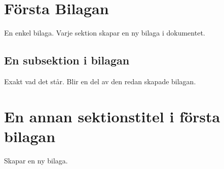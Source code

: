 \section{Första Bilagan}
En enkel bilaga. Varje sektion skapar en ny bilaga i dokumentet.

\subsection{En subsektion i bilagan}
Exakt vad det står. Blir en del av den redan skapade bilagan.

\section{En annan sektionstitel i första bilagan}
Skapar en ny bilaga.
